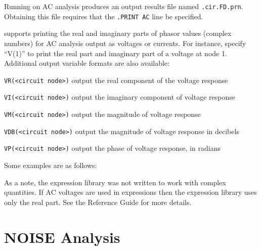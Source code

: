 \label{AC_print}

Running \Xyce{} on AC analysis produces an output results file named
\verb|.cir.FD.prn|. Obtaining this file requires that the \verb|.PRINT AC| line
be specified.

\Xyce{}  supports printing the real and imaginary parts of phasor values
(complex numbers) for AC analysis output as voltages or currents. For instance,
specify ``V(1)'' to print the real part and imaginary part of a voltage at
node 1. Additional output variable formats are also available:
\begin{XyceItemize}
\item \texttt{VR(<circuit node>)} output the real component of the voltage response
\item \texttt{VI(<circuit node>)} output the imaginary component of voltage response
\item \texttt{VM(<circuit node>)} output the magnitude of voltage response
\item \texttt{VDB(<circuit node>)} output the magnitude of voltage response in decibels
\item \texttt{VP(<circuit node>)} output the phase of voltage response, in radians
\end{XyceItemize}

Some examples are as follows: 

As a note, the \Xyce{} expression library was not written to work with complex 
quantities. If AC voltages are used in expressions then the expression library 
uses only the real part.  See the \Xyce{} Reference Guide\ReferenceGuide{}
for more details.


\section{NOISE Analysis}
\label{NOISE_Analysis}
\label{NOISE_Sweep_Overview}
 
 

